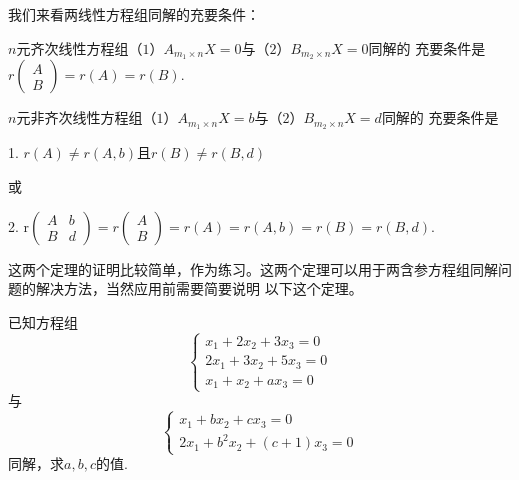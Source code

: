 我们来看两线性方程组同解的充要条件：
\begin{theorem}
	$n$元齐次线性方程组（$1$）$A_{m_1 \times n}X=0$与（$2$）$B_{m_2 \times n}X=0$同解的
	充要条件是$r\begin{pmatrix}
		A \\ B
	\end{pmatrix}=r(A)=r(B)$.
\end{theorem}
\begin{theorem}
	$n$元非齐次线性方程组（$1$）$A_{m_1 \times n}X=b$与（$2$）$B_{m_2 \times n}X=d$同解的
	充要条件是
	
	\textup{1. }$r(A)\neq r(A,b)$且$r(B)\neq r(B,d)$
	
	或
	
	\textup{2. }r$\begin{pmatrix}
		A & b \\ B & d
	\end{pmatrix}=r\begin{pmatrix}
		A \\ B
	\end{pmatrix}=r(A)=r(A,b)=r(B)=r(B,d)$.
\end{theorem}
这两个定理的证明比较简单，作为练习。这两个定理可以用于两含参方程组同解问题的解决方法，当然应用前需要简要说明
以下这个定理。
\begin{example}
	已知方程组$$\begin{cases}
		x_1+2x_2+3x_3=0 \\ 2x_1+3x_2+5x_3=0 \\ x_1+x_2+ax_3=0
	\end{cases}$$
	与$$\begin{cases}
		x_1+bx_2+cx_3=0 \\ 2x_1+b^2x_2+(c+1)x_3=0
	\end{cases}$$
	同解，求$a,b,c$的值.
\end{example}
